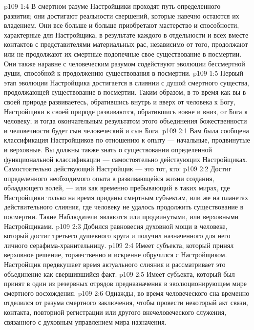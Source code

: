 \vs p109 1:4 В смертном разуме Настройщики проходят путь определенного развития; они достигают реальности свершений, которые навечно остаются их владением. Они все больше и больше приобретают мастерство и способности, характерные для Настройщика, в результате каждого в отдельности и всех вместе контактов с представителями материальных рас, независимо от того, продолжают или не продолжают их смертные подопечные свое существование в посмертии. Они также наравне с человеческим разумом содействуют эволюции бессмертной души, способной к продолжению существования в посмертии.
\vs p109 1:5 Первый этап эволюции Настройщика достигается в слиянии с душой смертного существа, продолжающей существование в посмертии. Таким образом, в то время как вы в своей природе развиваетесь, обратившись внутрь и вверх от человека к Богу, Настройщики в своей природе развиваются, обратившись вовне и вниз, от Бога к человеку; и тогда окончательным результатом этого объединения божественности и человечности будет сын человеческий и сын Бога.
\vs p109 2:1 Вам была сообщена классификация Настройщиков по отношению к опыту --- начальные, продвинутые и верховные. Вы должны также знать о существовании определенной функциональной классификации --- самостоятельно действующих Настройщиках. Самостоятельно действующий Настройщик --- это тот, кто:
\vs p109 2:2 \bibnobreakspace Достиг определенного необходимого опыта в развивающейся жизни создания, обладающего волей, --- или как временно пребывающий в таких мирах, где Настройщики только на время приданы смертным субъектам, или же на планетах действительного слияния, где человеку не удалось продолжить существование в посмертии. Такие Наблюдатели являются или продвинутыми, или верховными Настройщиками.
\vs p109 2:3 \bibnobreakspace Добился равновесия духовной мощи в человеке, который достиг третьего душевного круга и получил назначенного для него личного серафима\hyp{}хранительницу.
\vs p109 2:4 \bibnobreakspace Имеет субъекта, который принял верховное решение, торжественно и искренне обручился с Настройщиком. Настройщик предвкушает время актуального слияния и рассматривает это объединение как свершившийся факт.
\vs p109 2:5 \bibnobreakspace Имеет субъекта, который был принят в один из резервных отрядов предназначения в эволюционирующем мире смертного восхождения.
\vs p109 2:6 \bibnobreakspace Однажды, во время человеческого сна временно отделился от разума смертного заключения, чтобы провести некоторый акт связи, контакта, повторной регистрации или другого внечеловеческого служения, связанного с духовным управлением мира назначения.
